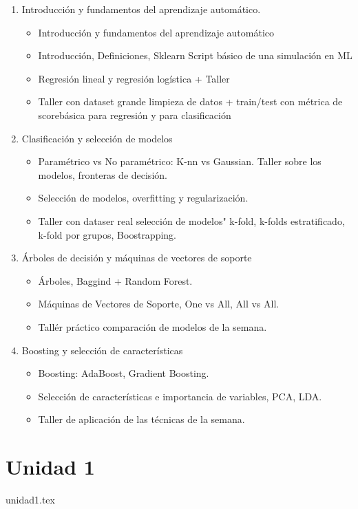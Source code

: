 
\begin{enumerate}
    \item Introducci\'on y fundamentos del aprendizaje autom\'atico.
    \begin{itemize}
        \item Introducci\'on y fundamentos del aprendizaje autom\'atico
        \item Introducci\'on, Definiciones, Sklearn Script b\'asico de una simulaci\'on en ML
        \item Regresi\'on lineal y regresi\'on log\'istica + Taller
        \item Taller con dataset grande limpieza de datos + train/test con m\'etrica de scoreb\'asica para regresi\'on y para clasificaci\'on
    \end{itemize}
    \item Clasificaci\'on y selecci\'on de modelos
    \begin{itemize}
        \item Param\'etrico vs No param\'etrico: K-nn vs Gaussian. Taller sobre los modelos, fronteras de decisi\'on.
        \item Selecci\'on de modelos, overfitting y regularizaci\'on. 
        \item Taller con dataser real selecci\'on de modelos" k-fold, k-folds estratificado, k-fold por grupos, Boostrapping.
    \end{itemize}
    \item \'Arboles de decisi\'on y m\'aquinas de vectores de soporte
    \begin{itemize}
        \item \'Arboles, Baggind + Random Forest.
        \item M\'aquinas de Vectores de Soporte, One vs All, All vs All.
        \item Tall\'er pr\'actico comparaci\'on de modelos de la semana.
    \end{itemize}
    \item Boosting y selecci\'on de caracter\'isticas
    \begin{itemize}
        \item Boosting: AdaBoost, Gradient Boosting.
        \item Selecci\'on de caracter\'isticas e importancia de variables, PCA, LDA.
        \item Taller de aplicaci\'on de las t\'ecnicas de la semana.
    \end{itemize}
\end{enumerate}
\section{Unidad 1}
{unidad1.tex}